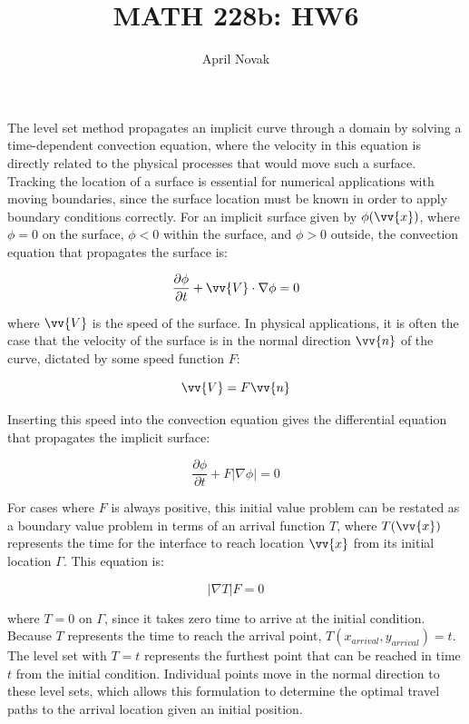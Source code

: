 \documentclass[10pt]{article}
\newcommand{\beq}{\begin{equation}}
\newcommand{\eeq}{\end{equation}}
\begin{document}
\title{MATH 228b: HW6}
\author{April Novak}

\maketitle

\section{}
The level set method propagates an implicit curve through a domain by solving a time-dependent convection equation, where the velocity in this equation is directly related to the physical processes that would move such a surface. Tracking the location of a surface is essential for numerical applications with moving boundaries, since the surface location must be known in order to apply boundary conditions correctly. For an implicit surface given by \(\phi(\vv{x})\), where \(\phi=0\) on the surface, \(\phi<0\) within the surface, and \(\phi>0\) outside, the convection equation that propagates the surface is:

\beq
\frac{\partial\phi}{\partial t}+\vv{V}\cdot\nabla\phi=0
\eeq

where \(\vv{V}\) is the speed of the surface. In physical applications, it is often the case that the velocity of the surface is in the normal direction \(\vv{n}\) of the curve, dictated by some speed function \(F\):

\beq
\vv{V}=F\vv{n}
\eeq

Inserting this speed into the convection equation gives the differential equation that propagates the implicit surface:

\beq
\frac{\partial\phi}{\partial t}+F|\nabla\phi|=0
\eeq

For cases where \(F\) is always positive, this initial value problem can be restated as a boundary value problem in terms of an arrival function \(T\), where \(T(\vv{x})\) represents the time for the interface to reach location \(\vv{x}\) from its initial location \(\Gamma\). This equation is:

\beq
|\nabla T|F=0
\eeq

where \(T=0\) on \(\Gamma\), since it takes zero time to arrive at the initial condition. Because \(T\) represents the time to reach the arrival point, \(T(x_{arrival}, y_{arrival})=t\). The level set with \(T=t\) represents the furthest point that can be reached in time \(t\) from the initial condition. Individual points move in the normal direction to these level sets, which allows this formulation to determine the optimal travel paths to the arrival location given an initial position. 
\end{document}
